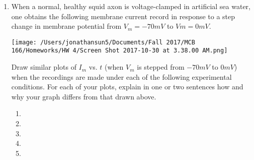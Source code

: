 \documentclass[11pt]{article}
\begin{document}
\begin{enumerate}[label=\arabic*.]
\begin{enumerate}[label=(\alph*)]
\item




\end{enumerate}

\newpage
\item
When a normal, healthy squid axon is voltage-clamped in artificial
sea water, one obtains the following membrane current record in response
to a step change in membrane potential from $V_m = -70 mV$
to $Vm = 0 mV$.
\begin{center}
\texttt{[image: /Users/jonathansun5/Documents/Fall 2017/MCB 166/Homeworks/HW 4/Screen Shot 2017-10-30 at 3.38.00 AM.png]}
\end{center}
Draw similar plots of $I_m$ vs. $t$ (when $V_m$ is stepped from $- 70 mV$ to $0 mV$) when the recordings are made under each of the following experimental conditions. For each of your plots, explain in one or two sentences how and why your graph differs from that drawn above.
\begin{enumerate}[label=(\alph*)]
\item




\item




\item




\item




\item





\end{enumerate}









\end{enumerate}
\end{document}
